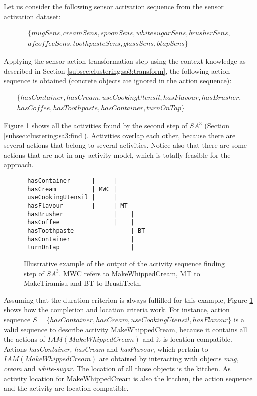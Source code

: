 Let us consider the following sensor activation sequence from the sensor activation dataset:

\begin{equation*}
\begin{split}
 \{mugSens, creamSens, spoonSens, whitesugarSens, brusherSens, \\ 
 afcoffeeSens, toothpasteSens, glassSens, btapSens\}
\end{split}  
\end{equation*}

Applying the sensor-action transformation step using the context knowledge as described in Section \ref{subsec:clustering:sa3:transform}, the following action sequence is obtained (concrete objects are ignored in the action sequence):

\begin{equation*}
\begin{split}
 \{hasContainer, hasCream, useCookingUtensil, hasFlavour, hasBrusher, \\ 
 hasCoffee, hasToothpaste, hasContainer, turnOnTap\}
\end{split}  
\end{equation*}

Figure \ref{fig:overlap-l} shows all the activities found by the second step of $SA^3$ (Section \ref{subsec:clustering:sa3:find}). Activities overlap each other, because there are several actions that belong to several activities. Notice also that there are some actions that are not in any activity model, which is totally feasible for the approach.

\begin{figure}[htbp]
 \begin{small}
\begin{lstlisting}
 hasContainer      |     |
 hasCream          | MWC |
 useCookingUtensil |     |
 hasFlavour        |     | MT 
 hasBrusher              |    |
 hasCoffee               |    |
 hasToothpaste                | BT
 hasContainer                 |
 turnOnTap                    |
\end{lstlisting}
\caption{Illustrative example of the output of the activity sequence finding step of $SA^3$. MWC refers to MakeWhippedCream, MT to MakeTiramisu  and BT to BrushTeeth.}
\label{fig:overlap-l}
\end{small}
\end{figure}

Assuming that the duration criterion is always fulfilled for this example, Figure \ref{fig:overlap-l} shows how the completion and location criteria work. For instance, action sequence $S = \{hasContainer, hasCream, useCookingUtensil, hasFlavour\}$ is a valid sequence to describe activity MakeWhippedCream, because it contains all the actions of $IAM(MakeWhippedCream)$ and it is location compatible. Actions \textit{hasContainer, hasCream} and \textit{hasFlavour}, which pertain to $IAM(MakeWhippedCream)$ are obtained by interacting with objects \textit{mug, cream} and \textit{white-sugar}. The location of all those objects is the kitchen. As activity location for MakeWhippedCream is also the kitchen, the action sequence and the activity are location compatible.

